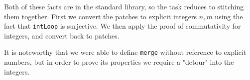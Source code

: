 Both of these facts are in the standard library, so the task reduces to stitching them together.
First we convert the patches to explicit integers $n, m$ using the fact that \texttt{intLoop} is surjective.
We then apply the proof of commutativity for integers, and convert back to patches.

It is noteworthy that we were able to define \texttt{merge} without reference to explicit numbers,
but in order to prove its properties we require a "detour" into the integers.
\begin{code}%
\>[0]\AgdaSpace{}%
\AgdaSymbol{:}\AgdaSpace{}%
\AgdaSymbol{(}\AgdaSpace{}%
\AgdaSymbol{:}\AgdaSpace{}%
\AgdaSymbol{)}\AgdaSpace{}%
\AgdaSpace{}%
\AgdaFunction{∃[}\AgdaSpace{}%
\AgdaSpace{}%
\AgdaFunction{]}\AgdaSpace{}%
\AgdaSymbol{(}\AgdaSpace{}%
\AgdaSpace{}%
\AgdaSpace{}%
\AgdaSymbol{)}\<%
\\
\>[0]\AgdaSpace{}%
\AgdaSpace{}%
\AgdaSymbol{=}\AgdaSpace{}%
\AgdaSpace{}%
\AgdaSpace{}%
\AgdaSpace{}%
\AgdaOperator{\AgdaInductiveConstructor{,}}\AgdaSpace{}%
\AgdaSpace{}%
\AgdaSymbol{(}\AgdaSpace{}%
\AgdaSpace{}%
\AgdaSymbol{)}\<%
\\
%
\\[\AgdaEmptyExtraSkip]%
\>[0]\AgdaSpace{}%
\AgdaSymbol{:}\AgdaSpace{}%
\AgdaSymbol{(}\AgdaSpace{}%
\AgdaSpace{}%
\AgdaSymbol{:}\AgdaSpace{}%
\AgdaSymbol{)}\AgdaSpace{}%
\AgdaSpace{}%
\AgdaSpace{}%
\AgdaSpace{}%
\AgdaSpace{}%
\AgdaSpace{}%
\AgdaSpace{}%
\AgdaSpace{}%
\<%
\\
\>[0]\AgdaSpace{}%
\AgdaSpace{}%
\AgdaSpace{}%
\AgdaSymbol{=}\AgdaSpace{}%
%
\>[163I]\AgdaSymbol{(}\AgdaSpace{}%
\AgdaOperator{\AgdaInductiveConstructor{,}}\AgdaSpace{}%
\AgdaSymbol{)}\AgdaSpace{}%
\AgdaSymbol{=}\AgdaSpace{}%
\AgdaSpace{}%
\<%
\\
\>[.][@{}l@{}]\<[163I]%
\>[21]\AgdaSymbol{(}\AgdaSpace{}%
\AgdaOperator{\AgdaInductiveConstructor{,}}\AgdaSpace{}%

\end{code}

